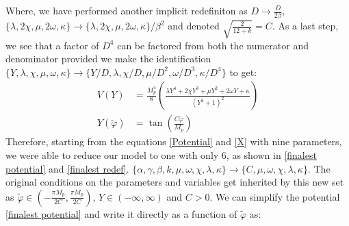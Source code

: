\documentclass[aps,prd,reprint,preprintnumbers,showpacs,floatfix,nofootinbib,superscript address]{revtex4-2}
\begin{document}
Where, we have performed another implicit redefiniton as $D \rightarrow \frac{D}{2\beta}$, $ \{\lambda, 2\chi, \mu, 2\omega,  \kappa \} \rightarrow \{\lambda, 2\chi, \mu, 2\omega,  \kappa \} /\beta^2$ and denoted $\sqrt{\frac{2}{12+k}} = C$. As a last step, we see that a factor of $D^4$ can be factored from both the numerator and denominator provided we make the identification $\{Y, \lambda, \chi, \mu, \omega, \kappa \} \rightarrow \{Y/D, \lambda, \chi/D, \mu/D^2, \omega/D^3, \kappa/D^4 \}$ to get:
\begin{align}
    V(Y) &=  \frac{M_p^4}{8}  \left(\frac{\lambda Y^4 + 2 \chi Y^3 + \mu Y^2  + 2\omega Y + \kappa}{(Y^2 + 1)^2} \right) \label{finalest potential} \\
    Y(\tilde{\varphi}) &=  \tan \left(\frac{C \tilde{\varphi}}{M_p} \right) \label{finalest redef}
\end{align}
Therefore, starting from the equations \ref{Potential} and \ref{X} with nine parameters, we were able to reduce our model to one with only 6, as shown in \ref{finalest potential} and \ref{finalest redef}. $\{\alpha, \gamma,\beta, k , \mu, \omega, \chi, \lambda, \kappa\} \rightarrow \{C , \mu, \omega, \chi, \lambda, \kappa\}$. The original conditions on the parameters and variables get inherited by this new set as $\tilde{\varphi} \in (-\frac{\pi M_p}{2C},\frac{\pi M_p}{2C})$, $Y \in (-\infty,\infty)$ and $C > 0$. We can simplify the potential \ref{finalest potential} and write it directly as a function of $\tilde{\varphi}$ as:
\end{document}
